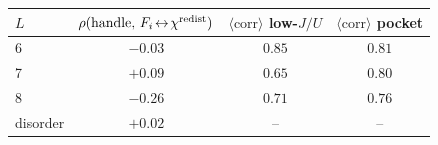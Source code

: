 \begin{tabular}{lccc}
\toprule
$L$ & $\rho(\text{handle},\,F_i\!\leftrightarrow\!\chi^{\rm redist})$ & $\langle\text{corr}\rangle$ low-$J/U$ & $\langle\text{corr}\rangle$ pocket \\
\midrule
6 & $-0.03$ & $0.85$ & $0.81$ \\
7 & $+0.09$ & $0.65$ & $0.80$ \\
8 & $-0.26$ & $0.71$ & $0.76$ \\
disorder & $+0.02$ & -- & -- \\
\bottomrule
\end{tabular}
